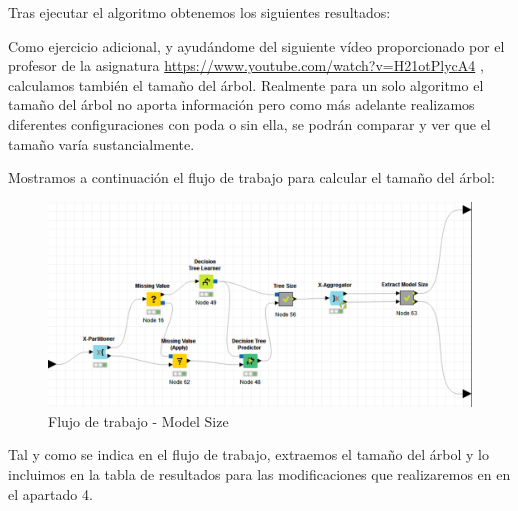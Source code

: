 	Tras ejecutar el algoritmo obtenemos los siguientes resultados:
	
	\begin{table}[h]
	\end{table}

	Como ejercicio adicional, y ayudándome del siguiente vídeo proporcionado por el profesor de la asignatura \href{url}{https://www.youtube.com/watch?v=H21otPlycA4} , calculamos también el tamaño del árbol. 
	Realmente para un solo algoritmo el tamaño del árbol no aporta información pero como más adelante realizamos diferentes configuraciones con poda o sin ella, se podrán comparar y ver que el tamaño varía sustancialmente.
	
	
	Mostramos a continuación el flujo de trabajo para calcular el tamaño del árbol:
	
	\begin{figure}[H]
		\centering
		\includegraphics[width=1\textwidth]{img/size.png}
		\caption{Flujo de trabajo - Model Size}
	\end{figure}

	Tal y como se indica en el flujo de trabajo, extraemos el tamaño del árbol y lo incluimos en la tabla de resultados para las modificaciones que realizaremos en  en el apartado 4.
	
